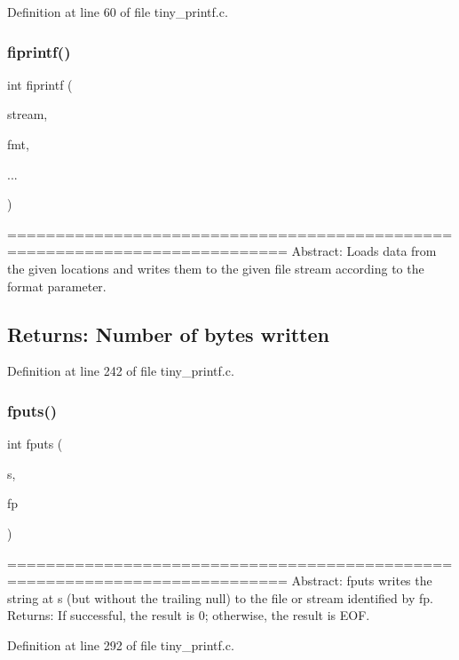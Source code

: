 Definition at line 60 of file tiny\+\_\+printf.\+c.

\mbox{\label{tiny__printf_8c_a589431508eafb525a1bf8610e23868dd}} 
\subsubsection{fiprintf()}
{\footnotesize\ttfamily int fiprintf (\begin{DoxyParamCaption}\item[{F\+I\+LE $\ast$}]{stream,  }\item[{const char $\ast$}]{fmt,  }\item[{}]{... }\end{DoxyParamCaption})}

=========================================================================== Abstract\+: Loads data from the given locations and writes them to the given file stream according to the format parameter. \subsection*{Returns\+: Number of bytes written }

Definition at line 242 of file tiny\+\_\+printf.\+c.

\mbox{\label{tiny__printf_8c_a365b15135fac34c613879b173000ec42}} 
\subsubsection{fputs()}
{\footnotesize\ttfamily int fputs (\begin{DoxyParamCaption}\item[{const char $\ast$}]{s,  }\item[{F\+I\+LE $\ast$}]{fp }\end{DoxyParamCaption})}

=========================================================================== Abstract\+: fputs writes the string at s (but without the trailing null) to the file or stream identified by fp. Returns\+: If successful, the result is 0; otherwise, the result is E\+OF. 

 

Definition at line 292 of file tiny\+\_\+printf.\+c.

